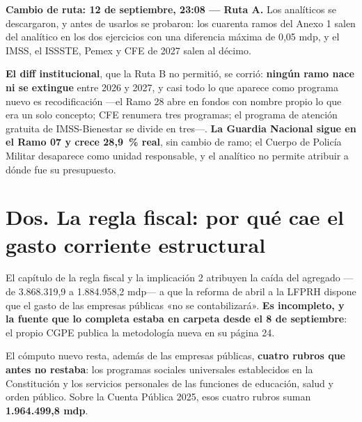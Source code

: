 \textbf{Cambio de ruta: 12 de septiembre, 23:08 --- Ruta A.} Los analíticos se descargaron,
y antes de usarlos se probaron: los cuarenta ramos del Anexo 1 salen del analítico en los
dos ejercicios con una diferencia máxima de 0,05 mdp, y el IMSS, el ISSSTE, Pemex y CFE de
2027 salen al décimo.


\textbf{El diff institucional}, que la Ruta B no permitió, se corrió: \textbf{ningún ramo
nace ni se extingue} entre 2026 y 2027, y casi todo lo que aparece como programa nuevo es
recodificación ---el Ramo 28 abre en fondos con nombre propio lo que era un solo concepto;
CFE renumera tres programas; el programa de atención gratuita de IMSS-Bienestar se divide en
tres---. \textbf{La Guardia Nacional sigue en el Ramo 07 y crece 28,9~\% real}, sin cambio de
ramo; el Cuerpo de Policía Militar desaparece como unidad responsable, y el analítico no
permite atribuir a dónde fue su presupuesto.

\section*{Dos. La regla fiscal: por qué cae el gasto corriente estructural}

El capítulo de la regla fiscal y la implicación 2 atribuyen la caída del agregado ---de
3.868.319,9 a 1.884.958,2 mdp--- a que la reforma de abril a la LFPRH dispone que el gasto
de las empresas públicas «no se contabilizará». \textbf{Es incompleto, y la fuente que lo
completa estaba en carpeta desde el 8 de septiembre}: el propio CGPE publica la metodología
nueva en su página 24.



El cómputo nuevo resta, además de las empresas públicas, \textbf{cuatro rubros que antes no
restaba}: los programas sociales universales establecidos en la Constitución y los servicios
personales de las funciones de educación, salud y orden público. Sobre la Cuenta Pública
2025, esos cuatro rubros suman \textbf{1.964.499,8 mdp}.

